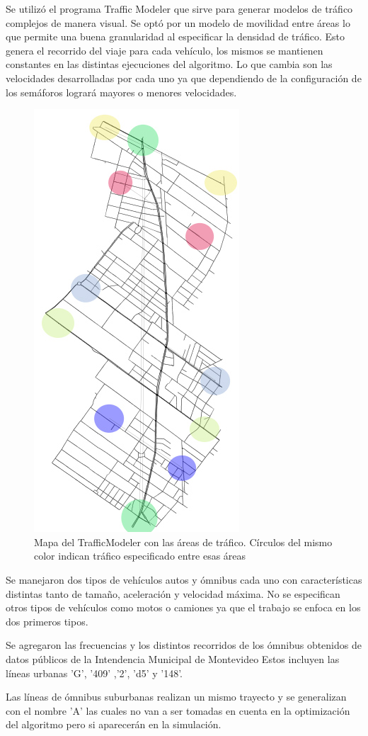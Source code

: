 Se utilizó el programa Traffic Modeler \citep{TrafficModeler} que sirve para generar modelos de tráfico complejos de manera visual. Se optó por un modelo de movilidad entre áreas lo que permite una buena granularidad al especificar la densidad de tráfico. Esto genera el recorrido del viaje para cada vehículo, los mismos se mantienen constantes en las distintas ejecuciones del algoritmo. Lo que cambia son las velocidades desarrolladas por cada uno ya que dependiendo de la configuración de los semáforos logrará mayores o menores velocidades.



\begin{figure}[h]
	\centering
	\includegraphics[width=0.4\linewidth]{Figures/areaflow1}
	\caption{Mapa del TrafficModeler con las áreas de tráfico. Círculos del mismo color indican tráfico especificado entre esas áreas}
	\label{fig:areaflow1}
\end{figure}


Se manejaron dos tipos de vehículos autos y ómnibus cada uno con características distintas tanto de tamaño, aceleración y velocidad máxima. No se especifican otros tipos de vehículos como motos o camiones ya que el trabajo se enfoca en los dos primeros tipos.

Se agregaron las frecuencias y los distintos recorridos de los ómnibus obtenidos de datos públicos de la Intendencia Municipal de Montevideo \citep{IMM}
Estos incluyen las líneas urbanas  'G', '409' ,'2', 'd5'  y  '148'. 

Las líneas de ómnibus suburbanas realizan  un mismo  trayecto y se generalizan con el nombre 'A' las cuales no van a ser tomadas en cuenta en la optimización del algoritmo pero si aparecerán en la simulación.

